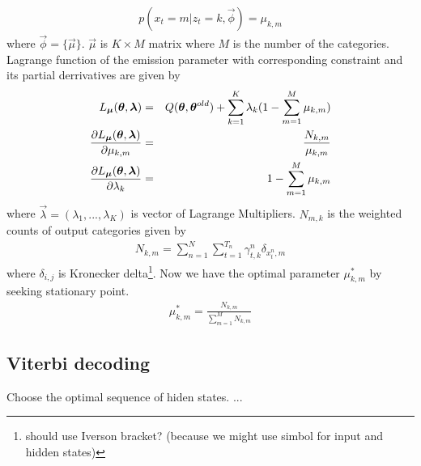 \begin{eqnarray}
p(x_t = m | z_t = k, \vec{\phi}) = \mu_{k, m}
\end{eqnarray}
where $\vec{\phi} = \{\vec{\mu}\}$. $\vec{\mu}$ is $K \times M$ matrix where $M$ is the number of the categories. 
Lagrange function of the emission parameter with corresponding constraint and its partial derrivatives are  given by
\begin{eqnarray}
  L_{\vec{\mu}}(\vec{\theta}, \vec{\lambda}) &=& Q(\mathbf{\theta}, \mathbf{\theta}^{old}) + \sum_{k=1}^{K} \lambda_k (1 - \sum_{m=1}^M \mu_{k, m}) \\
  \pard{L_{\vec{\mu}}(\vec{\theta}, \vec{\lambda})}{\mu_{k,m}} &=& \frac{ N_{k, m} }{\mu_{k, m} }\\
  \pard{L_{\vec{\mu}}(\vec{\theta}, \vec{\lambda})}{\lambda_{k}} &=& 1 - \sum_{m=1}^M \mu_{k, m}
\end{eqnarray}
where $\vec{\lambda} = (\lambda_1, ..., \lambda_K)$ is vector of Lagrange Multipliers. 
$N_{m, k}$ is the weighted counts of output categories given by
\begin{eqnarray}
  N_{k, m} = \sum_{n=1}^N \sum_{t=1}^{T_n} \gamma^n_{t, k} \delta_{x^n_t, m}
\end{eqnarray}
where $\delta_{i,j}$ is Kronecker delta\footnote{should use Iverson bracket? (because we might use simbol for input and hidden states)}.
Now we have the optimal parameter $\mu^*_{k,m}$ by seeking stationary point.
\begin{eqnarray}
  \mu^*_{k,m} = \frac{N_{k,m}}{\sum_{m=1}^{M} N_{k,m}} 
\end{eqnarray}

\subsection{Viterbi decoding}
Choose the optimal sequence of hiden states.
...










